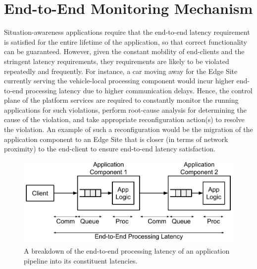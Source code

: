 \section{End-to-End Monitoring Mechanism}
Situation-awareness applications require that the end-to-end latency requirement is satisfied for the entire lifetime of the application, so that correct functionality can be guaranteed. However, given the constant mobility of end-clients and the stringent latency requirements, they requirements are likely to be violated repeatedly and frequently. For instance, a car moving away for the Edge Site currently serving the vehicle-local processing component would incur higher end-to-end processing latency due to higher communication delays. Hence, the control plane of the platform services are required to constantly monitor the running applications for such violations, perform root-cause analysis for determining the cause of the violation, and take appropriate reconfiguration action(s) to resolve the violation. An example of such a reconfiguration would be the migration of the application component to an Edge Site that is closer (in terms of network proximity) to the end-client to ensure end-to-end latency satisfaction.
\begin{figure}
\centering
\includegraphics[width=0.75\linewidth]{figures/mechanisms/monitoring/pipeline_latencies}
\caption{A breakdown of the end-to-end processing latency of an application pipeline into its constituent latencies.}
\label{fig:pipeline_latencies}
\end{figure}
